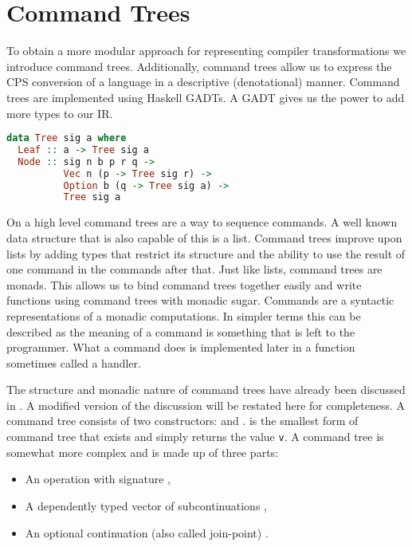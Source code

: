 
\chapter{\label{chap:commandtree}Command Trees}
To obtain a more modular approach for representing compiler transformations we introduce command trees\autocite{commandtreespoulsen}. Additionally, command trees allow us to express the \ac{CPS} conversion of a language in a descriptive (denotational) manner. Command trees are implemented using Haskell \acp{GADT}. A \ac{GADT} gives us the power to add more types to our \ac{IR}.

\begin{lstlisting}[language=Haskell]
data Tree sig a where
  Leaf :: a -> Tree sig a
  Node :: sig n b p r q ->
          Vec n (p -> Tree sig r) ->
          Option b (q -> Tree sig a) ->
          Tree sig a
\end{lstlisting}

On a high level command trees are a way to sequence commands. A well known data structure that is also capable of this is a list. Command trees improve upon lists by adding types that restrict its structure and the ability to use the result of one command in the commands after that. Just like lists, command trees are monads. This allows us to bind command trees together easily and write functions using command trees with monadic sugar. Commands are a syntactic representations of a monadic computations. In simpler terms this can be described as the meaning of a command is something that is left to the programmer. What a command does is implemented later in a function sometimes called a handler.

The structure and monadic nature of command trees have already been discussed in . A modified version of the discussion will be restated here for completeness. A command tree consists of two constructors:  and .  is the smallest form of command tree that exists and simply returns the value \lstinline{v}. A  command tree is somewhat more complex and is made up of three parts:

\begin{itemize}
\item An operation  with signature ,
\item A dependently typed vector of subcontinuations ,
\item An optional continuation (also called join-point) .
\end{itemize}

